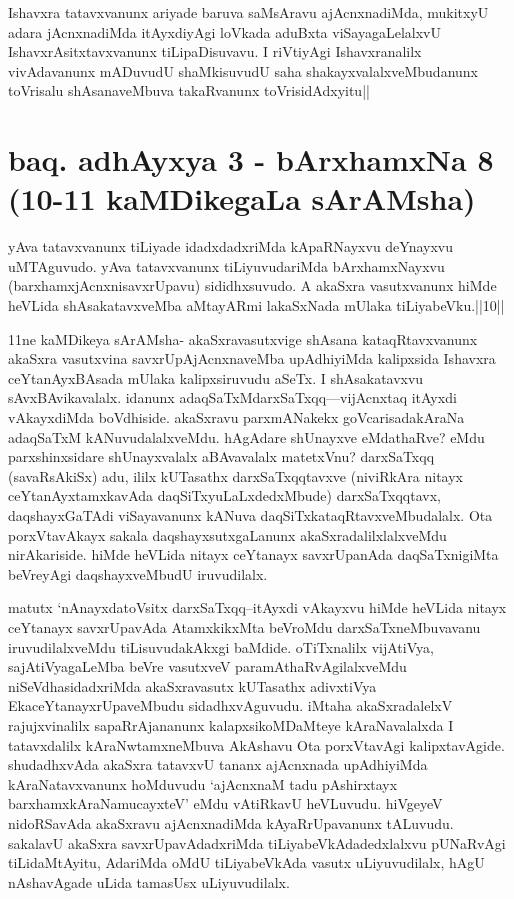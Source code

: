 \begin{artha}
Ishavxra tatavxvanunx ariyade baruva saMsAravu ajAcnxnadiMda, mukitxyU adara jAcnxnadiMda itAyxdiyAgi loVkada aduBxta viSayagaLelalxvU IshavxrAsitxtavxvanunx tiLipaDisuvavu. I riVtiyAgi Ishavxranalilx vivAdavanunx mADuvudU shaMkisuvudU saha shakayxvalalxveMbudanunx toVrisalu shAsanaveMbuva takaRvanunx toVrisidAdxyitu||
\end{artha}

\section*{baq. adhAyxya 3 - bArxhamxNa 8 (10-11 kaMDikegaLa sArAMsha)}

\begin{artha}
yAva tatavxvanunx tiLiyade idadxdadxriMda kApaRNayxvu deYnayxvu uMTAguvudo. yAva tatavxvanunx tiLiyuvudariMda bArxhamxNayxvu (barxhamxjAcnxnisavxrUpavu) sididhxsuvudo. A akaSxra vasutxvanunx hiMde heVLida shAsakatavxveMba aMtayARmi lakaSxNada mUlaka tiLiyabeVku.||10||
\end{artha}

\begin{artha}
11ne kaMDikeya sArAMsha- akaSxravasutxvige shAsana kataqRtavxvanunx akaSxra vasutxvina savxrUpAjAcnxnaveMba upAdhiyiMda kalipxsida Ishavxra ceYtanAyxBAsada mUlaka kalipxsiruvudu aSeTx. I shAsakatavxvu sAvxBAvikavalalx. idanunx adaqSaTxMdarxSaTxqq---vijAcnxtaq itAyxdi vAkayxdiMda boVdhiside. akaSxravu parxmANakekx goVcarisadakAraNa adaqSaTxM kANuvudalalxveMdu. hAgAdare shUnayxve eMdathaRve? eMdu parxshinxsidare shUnayxvalalx aBAvavalalx matetxVnu? darxSaTxqq (savaRsAkiSx) adu, ililx kUTasathx darxSaTxqqtavxve (niviRkAra nitayx ceYtanAyxtamxkavAda daqSiTxyuLaLxdedxMbude) darxSaTxqqtavx, daqshayxGaTAdi viSayavanunx kANuva daqSiTxkataqRtavxveMbudalalx. Ota porxVtavAkayx sakala daqshayxsutxgaLanunx akaSxradalilxlalxveMdu nirAkariside. hiMde heVLida nitayx ceYtanayx savxrUpanAda daqSaTxnigiMta beVreyAgi daqshayxveMbudU iruvudilalx. 
\end{artha}%

\begin{artha}
matutx `nAnayxdatoV\s sitx darxSaTxqq--itAyxdi vAkayxvu hiMde heVLida nitayx ceYtanayx savxrUpavAda AtamxkikxMta beVroMdu darxSaTxneMbuvavanu iruvudilalxveMdu tiLisuvudakAkxgi baMdide. oTiTxnalilx vijAtiVya, sajAtiVyagaLeMba beVre vasutxveV paramAthaRvAgilalxveMdu niSeVdhasidadxriMda akaSxravasutx kUTasathx adivxtiVya EkaceYtanayxrUpaveMbudu sidadhxvAguvudu. iMtaha akaSxradalelxV rajujxvinalilx sapaRrAjananunx kalapxsikoMDaMteye kAraNavalalxda I tatavxdalilx kAraNwtamxneMbuva AkAshavu Ota porxVtavAgi kalipxtavAgide. shudadhxvAda akaSxra tatavxvU tananx ajAcnxnada upAdhiyiMda kAraNatavxvanunx hoMduvudu `ajAcnxnaM tadu pAshirxtayx barxhamxkAraNamucayxteV' eMdu vAtiRkavU heVLuvudu. hiVgeyeV nidoRSavAda akaSxravu ajAcnxnadiMda kAyaRrUpavanunx tALuvudu. sakalavU akaSxra savxrUpavAdadxriMda tiLiyabeVkAdadedxlalxvu pUNaRvAgi tiLidaMtAyitu, AdariMda oMdU tiLiyabeVkAda vasutx uLiyuvudilalx, hAgU nAshavAgade uLida tamasUsx uLiyuvudilalx.
\end{artha}%


